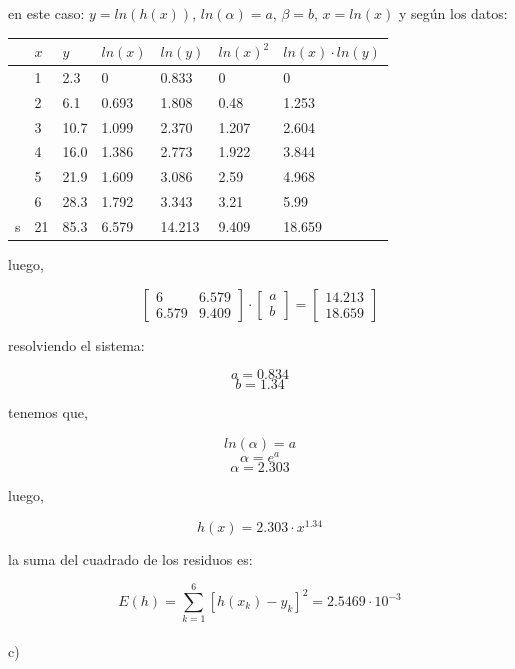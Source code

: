 \documentclass{article}
\begin{document}
en este caso: $y = ln(h(x))$, $ln(\alpha) = a$, $\beta = b$, $x=ln(x)$ y según los datos:
\begin{table}[H]
\centering
\begin{tabular}{|l|l|l|l|l|l|l|}
\hline
  & $x$  & $y$    & $ln(x)$ & $ln(y)$  & $ln(x)^2$ & $ln(x) \cdot ln(y)$ \\ \hline
  & 1  & 2.3  & 0     & 0.833  & 0                        & 0           \\
  & 2  & 6.1  & 0.693 & 1.808  & 0.48                     & 1.253       \\
  & 3  & 10.7 & 1.099 & 2.370  & 1.207                    & 2.604       \\
  & 4  & 16.0 & 1.386 & 2.773  & 1.922                    & 3.844       \\
  & 5  & 21.9 & 1.609 & 3.086  & 2.59                     & 4.968       \\
  & 6  & 28.3 & 1.792 & 3.343  & 3.21                     & 5.99        \\ \hline
s & 21 & 85.3 & 6.579 & 14.213 & 9.409                    & 18.659      \\ \hline
\end{tabular}
\end{table}

luego,

\[
\begin{bmatrix}
    6 & 6.579 \\
    6.579 & 9.409
\end{bmatrix}
\cdot
\begin{bmatrix}
    a \\ b
\end{bmatrix}
=
\begin{bmatrix}
    14.213 \\
    18.659
\end{bmatrix}
\]

resolviendo el sistema:

\[a = 0.834\]
\[b = 1.34\]

tenemos que,

\[ln(\alpha) = a\]
\[\alpha = e^a\]
\[\alpha = 2.303\]

luego,

\[h(x)=2.303 \cdot x^{1.34}\]

la suma del cuadrado de los residuos es:

\[
E(h) = \sum_{k=1}^{6}{[h(x_k)-y_k]^2} = 2.5469 \cdot 10^{-3}
\]\\

c)
\end{document}
